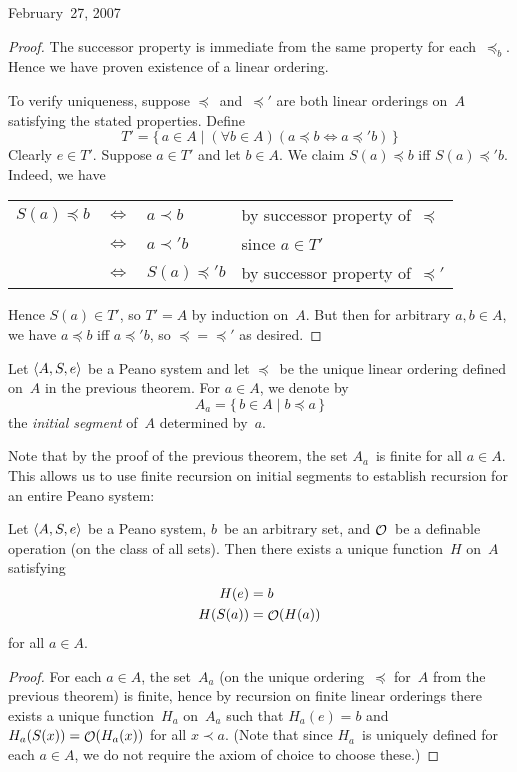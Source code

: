 \begin{lecture}{February~27, 2007}
\begin{proof}
The successor property is immediate from the same property for each~\(\preceq_b\). Hence we have proven existence of a linear ordering.

To verify uniqueness, suppose \(\preceq\)~and~\(\preceq'\) are both linear orderings on~\(A\) satisfying the stated properties. Define
\[T'=\{\,a\in A\mid (\forall b\in A)(a\preceq b\iff a\preceq' b)\,\}\]
Clearly \(e\in T'\). Suppose \(a\in T'\) and let \(b\in A\). We claim \(S(a)\preceq b\) iff \(S(a)\preceq' b\). Indeed,
we have
\begin{center}
\begin{tabular}{rcll}
\(S(a)\preceq b\)&\(\iff\)&\(a\prec b\)&by successor property of~\(\preceq\)\\
				&\(\iff\)&\(a\prec' b\)&since \(a\in T'\)\\
				&\(\iff\)&\(S(a)\preceq' b\)&by successor property of~\(\preceq'\)
\end{tabular}
\end{center}
Hence \(S(a)\in T'\), so \(T'=A\) by induction on~\(A\). But then for arbitrary \(a,b\in A\), we have \(a\preceq b\) iff \(a\preceq' b\), so \({\preceq}={\preceq'}\) as desired.
\end{proof}
\begin{defn}
Let \(\langle{A},{{S},{e}}\rangle\) be a Peano system and let \(\preceq\)~be the unique linear ordering defined on~\(A\) in the previous theorem. For \(a\in A\), we denote by
\[A_a=\{\,b\in A\mid b\preceq a\,\}\]
the \emph{initial segment} of~\(A\) determined by~\(a\).
\end{defn}
\noindent Note that by the proof of the previous theorem, the set \(A_a\)~is finite for all \(a\in A\). This allows us to use finite recursion on initial segments to establish recursion for an entire Peano system:
\begin{thm}
Let \(\langle{A},{{S},{e}}\rangle\) be a Peano system, \(b\)~be an arbitrary set, and \(\mathop{\mathcal{O}}\nolimits\)~be a definable operation (on the class of all sets). Then there exists a unique function~\(H\) on~\(A\) satisfying
\begin{align*}
H(e)&=b\\
H(S(a))&=\mathop{\mathcal{O}}\nolimits(H(a))
\end{align*}
for all \(a\in A\).
\end{thm}
\begin{proof}
For each \(a\in A\), the set~\(A_a\) (on the unique ordering~\(\preceq\) for~\(A\) from the previous theorem) is finite, hence by recursion on finite linear orderings there exists a unique function~\(H_a\) on~\(A_a\) such that \(H_a(e)=b\) and \(H_a(S(x))=\mathop{\mathcal{O}}\nolimits(H_a(x))\) for all \(x\prec a\). (Note that since \(H_a\)~is uniquely defined for each \(a\in A\), we do not require the axiom of choice to choose these.)


\end{proof}
\end{lecture}
